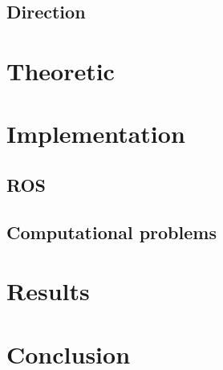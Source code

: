 \documentclass[12pt,fleqn]{report} %
\begin{document}
\section{Direction}


\chapter{Theoretic}
\chapter{Implementation}
\section{ROS}
\section{Computational problems}

\chapter{Results}

\chapter{Conclusion}
%


\nocite{*}

\end{document}
